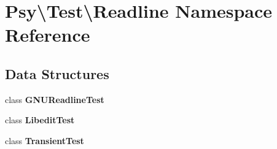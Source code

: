 \section{Psy\textbackslash{}Test\textbackslash{}Readline Namespace Reference}
\label{namespace_psy_1_1_test_1_1_readline}
\subsection*{Data Structures}
\begin{DoxyCompactItemize}
\item 
class {\bf G\+N\+U\+Readline\+Test}
\item 
class {\bf Libedit\+Test}
\item 
class {\bf Transient\+Test}
\end{DoxyCompactItemize}
